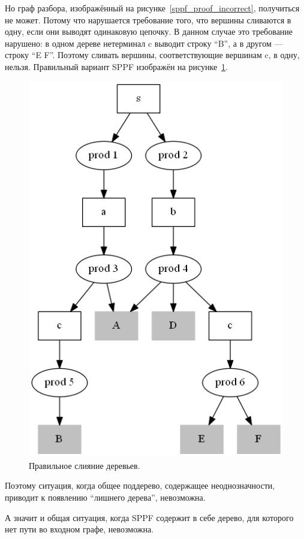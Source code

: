 Но граф разбора, изображённый на рисунке~\ref{sppf_proof_incorrect}, получиться не может. Потому что нарушается требование того, что вершины сливаются в одну, если они выводят одинаковую цепочку. В данном случае это требование нарушено: в одном дереве нетерминал c выводит строку ``B'', а в другом --- строку ``E F''. Поэтому сливать вершины, соответствующие вершинам c, в одну, нельзя. Правильный вариант SPPF изображён на рисунке~\ref{sppf_proof_correct}.

\begin{figure}[t]
\centering
\includegraphics{Ivanov/Pictures/SPPF_proof_correct.png}
\caption{Правильное слияние деревьев.}
\label{sppf_proof_correct}
\end{figure}

Поэтому ситуация, когда общее поддерево, содержащее неоднозначности, приводит к появлению ``лишнего дерева'', невозможна. 

А значит и общая ситуация, когда SPPF содержит в себе дерево, для которого нет пути во входном графе, невозможна.

